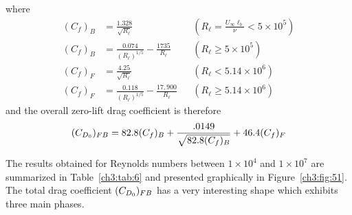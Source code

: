 where
\begin{align*}
(C_f)_B &= \frac{1.328}{\sqrt{R_\ell}}
  && \left(R_\ell = \frac{U_\infty\ell_b}{\nu} < 5 \times 10^{5}\right)\\
(C_f)_B &= \frac{0.074}{(R_\ell)^{1/5}} - \frac{1735}{R_\ell} && (R_\ell \ge 5 \times 10^{5})\\
(C_f)_F &= \frac{4.25}{\sqrt{R_\ell}} && (R_\ell < 5.14 \times 10^{6})\\
(C_f)_F &= \frac{0.118}{(R_\ell)^{1/5}} - \frac{17{,}900}{R_\ell} && (R_\ell \ge 5.14 \times 10^{6})
\end{align*}
and the overall zero-lift drag coefficient is therefore
\begin{equation*}
(C_{D_0})_{FB} = 82.8(C_f)_B + \frac{.0149}{\sqrt{82.8(C_f)_B}} + 46.4(C_f)_F
\end{equation*}

The results obtained for Reynolds numbers between $1 \times 10^{4}$ and $1 \times 10^{7}$ are
summarized in Table~\ref{ch3:tab:6} and presented graphically in Figure~\ref{ch3:fig:51}. The
total drag coefficient $(C_{D_0})_{FB}$ has a very interesting shape which exhibits three main
phases.

